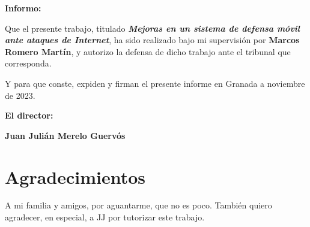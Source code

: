 \textbf{Informo:}

\vspace{0.5cm}

Que el presente trabajo, titulado \textit{\textbf{Mejoras en un sistema de defensa móvil ante ataques de Internet}},
ha sido realizado bajo mi supervisión por \textbf{Marcos Romero Martín}, y autorizo la defensa de dicho trabajo ante el tribunal
que corresponda.

\vspace{0.5cm}

Y para que conste, expiden y firman el presente informe en Granada a noviembre de 2023.

\vspace{1cm}

\textbf{El director: }

\vspace{5cm}

\noindent \textbf{Juan Julián Merelo Guervós}

\chapter*{Agradecimientos}
A mi familia y amigos, por aguantarme, que no es poco. También quiero agradecer, en especial, a JJ por tutorizar este trabajo.